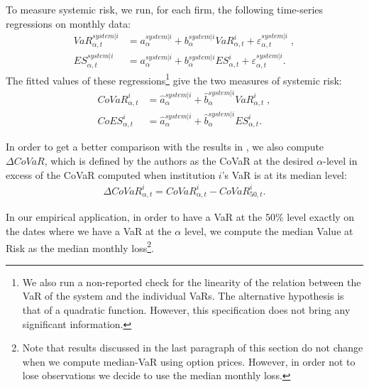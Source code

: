 \documentclass[11pt,a4paper,english]{article}
\begin{document}
To measure systemic risk, we run, for each firm, the following time-series regressions on monthly data:
\begin{align}
\label{eq: regressions}
VaR^{system|i}_{\alpha,t} &= a_{\alpha}^{system|i} + b_{\alpha}^{system|i}VaR_{\alpha,t}^{i}+\varepsilon_{{\alpha},t}^{system|i} \; , \\
ES^{system|i}_{\alpha,t} &= a_{\alpha}^{system|i} + b_{\alpha}^{system|i}ES_{\alpha,t}^{i}+\varepsilon_{\alpha,t}^{system|i}.
\end{align}
The fitted values of these regressions\footnote{We also run a non-reported check for the linearity of the relation between the VaR of the system and the individual VaRs. The alternative hypothesis is that of a quadratic function. However, this specification does not bring any significant information.} give the two measures of systemic risk:
\begin{align}
\label{eq: fitted1}
CoVaR^{i}_{\alpha,t} &= \hat{a}_{\alpha}^{system|i} + \hat{b}_{\alpha}^{system|i}VaR_{\alpha,t}^{i} \; , \\
\label{eq: fitted2}
CoES^{i}_{\alpha,t} &= \hat{a}_{\alpha}^{system|i} + \hat{b}_{\alpha}^{system|i}ES_{{\alpha},t}^{i}.
\end{align}

In order to get a better comparison with the results in \citet{Adrian2016}, we also compute $\Delta CoVaR$, which is defined by the authors as the CoVaR at the desired $\alpha$-level in excess of the CoVaR computed when institution $i$'s VaR is at its median level:
\begin{align}
\label{eq: deltacov}
\Delta CoVaR^i_{\alpha,t} = CoVaR^i_{\alpha,t}-CoVaR^i_{50,t}.
\end{align}

In our empirical application, in order to have a VaR at the 50\% level exactly on the dates where we have a VaR at the $\alpha$ level, we compute the median Value at Risk as the median monthly loss\footnote{Note that results discussed in the last paragraph of this section do not change when we compute median-VaR using option prices. However, in order not to lose observations we decide to use the median monthly loss.}.
\end{document}
